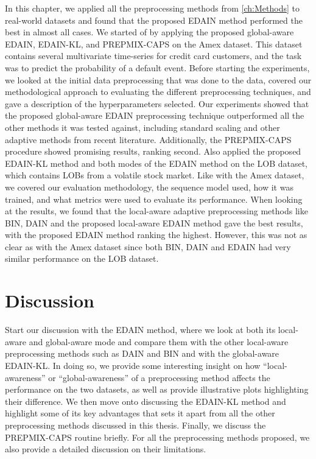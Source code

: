 \documentclass{statsmsc}
\begin{document}
{In this chapter, we applied all the preprocessing methods from \cref{ch:Methods} to real-world
datasets and found that the proposed \ac{EDAIN} method performed the best in almost all cases.
We started of by applying the proposed global-aware \ac{EDAIN}, \ac{EDAIN-KL}, and
\ac{PREPMIX-CAPS} on the Amex dataset.  This dataset contains several
multivariate time-series for credit card customers, and the task was to predict
the probability of a default event.  Before starting the experiments, we looked
at the initial data preprocessing that was done to the data, covered our
methodological approach to evaluating the different preprocessing techniques,
and gave a description of the hyperparameters selected.  Our experiments
showed that the proposed global-aware \ac{EDAIN} preprocessing technique
outperformed all the other methods it was tested against, including standard
scaling and other adaptive methods from recent literature.  Additionally, the
\ac{PREPMIX-CAPS} procedure showed promising results, ranking second.
Also applied the proposed \ac{EDAIN-KL} method and both modes of the \ac{EDAIN} method
on the \ac{LOB} dataset, which
contains \acp{LOB} from a volatile stock market.
Like with the Amex dataset, we covered our evaluation methodology, the sequence model used,
how it was trained, and what metrics were used to evaluate its performance.
When looking at the results, we found that the local-aware adaptive preprocessing methods like
\ac{BIN}, \ac{DAIN} and the proposed local-aware \ac{EDAIN} method gave the best results, with the
proposed \ac{EDAIN} method ranking the highest. However, this was not as clear as with the Amex
dataset since both \ac{BIN}, \ac{DAIN} and \ac{EDAIN} had very similar performance on the
\ac{LOB} dataset.



\chapter{Discussion} %


Start our discussion with the \ac{EDAIN} method, where we look at both its local-aware and
global-aware mode and compare them with the other local-aware preprocessing methods such as
\ac{DAIN} and \ac{BIN} and with the global-aware \ac{EDAIN-KL}.
In doing so, we provide some
interesting insight on how ``local-awareness'' or ``global-awareness'' of a preprocessing method
affects the performance on the two datasets, as well as provide illustrative plots highlighting
their difference.
We then move onto discussing the \ac{EDAIN-KL} method and highlight some of its key advantages
that sets it apart from all the other preprocessing methods discussed in this thesis. Finally,
we discuss the \ac{PREPMIX-CAPS} routine briefly. For all the preprocessing methods proposed,
we also provide a detailed discussion on their limitations.

}
\end{document}

